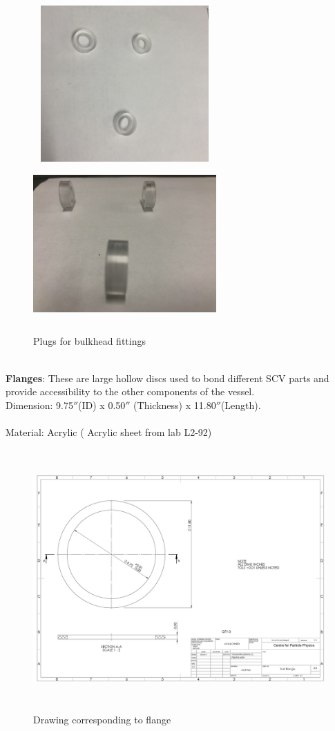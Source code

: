 \\
\begin{figure}[!htpb]
  \centering
  \includegraphics[width = 7cm, height=6cm ]{figures/plug1}
   \includegraphics[width = 7cm, height=6cm ]{figures/plug2}
  \caption{Plugs for bulkhead fittings}
  \label{fig:plug1}
\end{figure}
\\
\textbf{Flanges}:
These are large hollow discs used to bond different SCV parts and provide accessibility to the other components of the vessel.  
\\
Dimension: 9.75$''$(ID) x 0.50$''$ (Thickness) x 11.80$''$(Length).\\
\\
Material: Acrylic ( Acrylic sheet from lab L2-92)\\
\begin{figure}[!htpb]
  \centering
  \includegraphics[width = 12cm, height=10cm ]{figures/flange}
  \caption{Drawing corresponding to flange}
  \label{fig:flange}
\end{figure}

